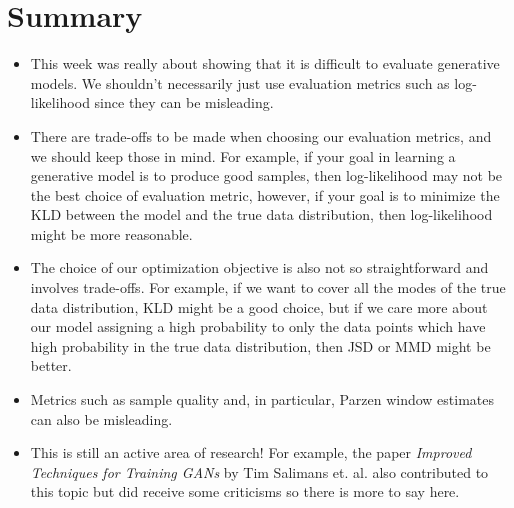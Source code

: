 \documentclass{article}
\begin{document}
\section{Summary}

\begin{itemize}
	\item This week was really about showing that it is difficult to evaluate generative models. We shouldn't necessarily just use evaluation metrics such as log-likelihood since they can be misleading. 
	\item There are trade-offs to be made when choosing our evaluation metrics, and we should keep those in mind. For example, if your goal in learning a generative model is to produce good samples, then log-likelihood may not be the best choice of evaluation metric, however, if your goal is to minimize the KLD between the model and the true data distribution, then log-likelihood might be more reasonable.
	\item The choice of our optimization objective is also not so straightforward and involves trade-offs. For example, if we want to cover all the modes of the true data distribution, KLD might be a good choice, but if we care more about our model assigning a high probability to only the data points which have high probability in the true data distribution, then JSD or MMD might be better.
	\item Metrics such as sample quality and, in particular, Parzen window estimates can also be misleading.
	\item This is still an active area of research! For example, the paper \emph{Improved Techniques for Training GANs} by Tim Salimans et. al. also contributed to this topic but did receive some criticisms so there is more to say here.
\end{itemize}

\end{document}
